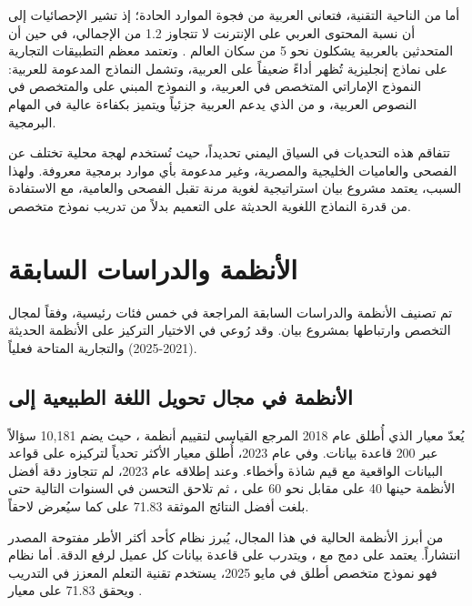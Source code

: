 أما من الناحية التقنية، فتعاني العربية من فجوة الموارد الحادة؛ إذ تشير
الإحصائيات إلى أن نسبة المحتوى العربي على الإنترنت لا تتجاوز 1.2\LR{\%} من
الإجمالي، في حين أن المتحدثين بالعربية يشكلون نحو 5\LR{\%} من سكان العالم
\cite{guellil2021arabic}. وتعتمد معظم التطبيقات التجارية على نماذج إنجليزية
تُظهر أداءً ضعيفاً على العربية، وتشمل النماذج المدعومة للعربية: 
النموذج الإماراتي المتخصص في العربية، و  النموذج المبني على
 والمتخصص في النصوص العربية، و  من  الذي
يدعم العربية جزئياً ويتميز بكفاءة عالية في المهام البرمجية.

تتفاقم هذه التحديات في السياق اليمني تحديداً، حيث تُستخدم لهجة محلية تختلف عن
الفصحى والعاميات الخليجية والمصرية، وغير مدعومة بأي موارد برمجية معروفة.
ولهذا السبب، يعتمد مشروع بيان استراتيجية لغوية مرنة تقبل الفصحى والعامية، مع
الاستفادة من قدرة النماذج اللغوية الحديثة على التعميم بدلاً من تدريب نموذج
متخصص.

\section{الأنظمة والدراسات السابقة}
\label{sec:related-work}

تم تصنيف الأنظمة والدراسات السابقة المراجعة في خمس فئات رئيسية، وفقاً لمجال
التخصص وارتباطها بمشروع بيان. وقد رُوعي في الاختيار التركيز على الأنظمة
الحديثة (2021-2025) والتجارية المتاحة فعلياً.

\subsection{الأنظمة في مجال تحويل اللغة الطبيعية إلى }
\label{subsec:related-nl2sql}
يُعدّ معيار  الذي أُطلق عام 2018 المرجع القياسي لتقييم أنظمة
، حيث يضم 10,181 سؤالاً عبر 200 قاعدة بيانات. وفي عام 2023،
أُطلق معيار  الأكثر تحدياً لتركيزه على قواعد البيانات الواقعية مع
قيم شاذة وأخطاء. وعند إطلاقه عام 2023، لم تتجاوز دقة أفضل الأنظمة حينها
40\LR{\%} على  مقابل نحو 60\LR{\%} على 
\cite{yu2018spider}، ثم تلاحق التحسن في السنوات التالية حتى بلغت أفضل
النتائج الموثقة 71.83\LR{\%} على  كما سيُعرض لاحقاً.

من أبرز الأنظمة الحالية في هذا المجال، يُبرز نظام 
\cite{vanna2024} كأحد أكثر الأطر مفتوحة المصدر انتشاراً. يعتمد  على
دمج  مع ، ويتدرب على قاعدة بيانات كل عميل لرفع الدقة.
أما نظام  \cite{arctic2025text2sql} فهو
نموذج متخصص أطلق في مايو 2025، يستخدم تقنية التعلم المعزز في التدريب ويحقق
71.83\LR{\%} على معيار .

